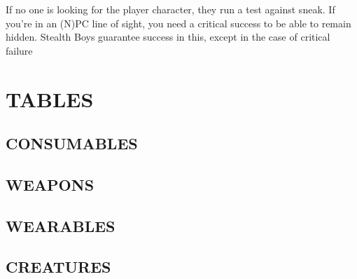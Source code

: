 \documentclass[11pt]{article} %
\begin{document}
If no one is looking for the player character, they run a test against sneak.
If you're in an (N)PC line of sight, you need a critical success to be able to remain hidden. Stealth Boys guarantee success in this, except in the case of critical failure


\newpage

\appendix
\addtolength{\oddsidemargin}{-0.4in}
\addtolength{\evensidemargin}{-0.4in}
\addtolength{\textwidth}{0.8in}
\section{TABLES}

\label{app:traits}

\label{app:perks}
\subsection{CONSUMABLES}



\label{app:chems}

\newpage
\subsection{WEAPONS}
\label{app:weapons}













\newpage
\subsection{WEARABLES}
\label{app:wearables}







\newpage
\addtolength{\oddsidemargin}{-0.8in}
\addtolength{\evensidemargin}{-0.8in}
\addtolength{\textwidth}{1.6in}
\subsection{CREATURES}

\end{document}
